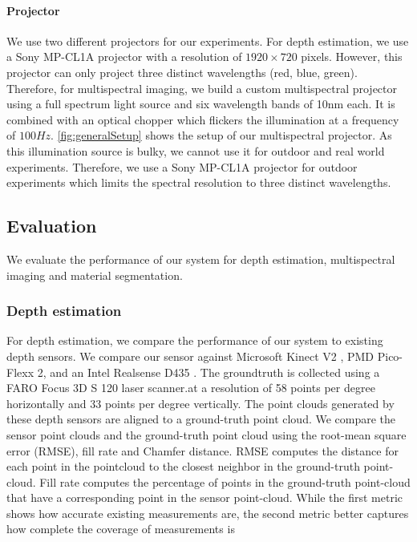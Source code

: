 \paragraph{Projector}

We use two different projectors for our experiments.
For depth estimation, we use a Sony MP-CL1A projector with a resolution of $1920\times720$ pixels.
However, this projector can only project three distinct wavelengths (red, blue, green).
Therefore, for multispectral imaging, we build a custom multispectral projector using a full spectrum light source and six wavelength bands of 10nm each.
It is combined with an optical chopper which flickers the illumination at a frequency of $100Hz$.
\Fig \ref{fig:generalSetup} shows the setup of our multispectral projector.
As this illumination source is bulky, we cannot use it for outdoor and real world experiments.
Therefore, we use a Sony MP-CL1A projector for outdoor experiments which limits the spectral resolution to three distinct wavelengths.
% 



\subsection{Evaluation}
We evaluate the performance of our system for depth estimation, multispectral imaging and material segmentation.

\subsubsection{Depth estimation}
\label{sec:eval:depth}
For depth estimation, we compare the performance of our system to existing depth sensors.
We compare our sensor against Microsoft Kinect V2 \cite{Kinectv2}, PMD Pico-Flexx 2\cite{pmdtec}, and an Intel Realsense D435 \cite{IntelRealSense}.
The groundtruth is collected using a FARO Focus 3D S 120 laser scanner.at a resolution of 
58 points per degree horizontally and 33 points per degree vertically.
The point clouds generated by these depth sensors are aligned to a ground-truth point cloud.
We compare the sensor point clouds and the ground-truth point cloud using the root-mean square error (RMSE), fill rate and Chamfer distance.
RMSE computes the distance for each point in the pointcloud to the closest neighbor in the ground-truth point-cloud.
Fill rate computes the percentage of points in the ground-truth point-cloud that have a corresponding point in the sensor point-cloud.
While the first metric shows how accurate existing measurements are, the second metric better captures how complete the coverage of measurements is

